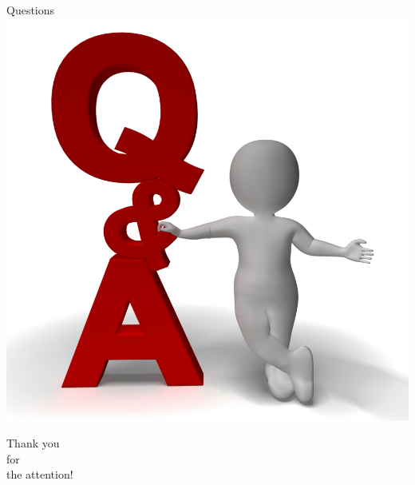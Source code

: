 \documentclass[12pt]{beamer}
\begin{document}
	\begin{frame}
	\begin{center}
	{\Huge Questions}\\
	\includegraphics[scale=0.25]{../questions.png}
	\end{center}
	\end{frame}
	
	\begin{frame}
	\begin{center}
	{\Huge Thank you\\for\\the attention!}
	\end{center}
	\end{frame}
\end{document}
